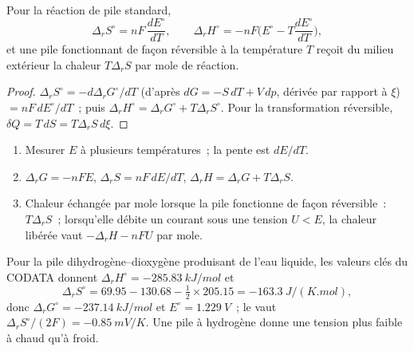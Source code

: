 \begin{proposition}\label{prop:b2:cell-thermodynamics:entropy}
Pour la réaction de pile standard,
\[
  \Delta_r S^\circ = nF\,\frac{dE^\circ}{dT}, \qquad
  \Delta_r H^\circ = -nF\Big(E^\circ - T\frac{dE^\circ}{dT}\Big),
\]
et une pile fonctionnant de façon réversible à la température $T$ reçoit du
milieu extérieur la chaleur $T\Delta_r S$ par mole de réaction.
\end{proposition}

\begin{proof}
$\Delta_r S^\circ = -d\Delta_r G^\circ/dT$ (d'après $dG = -S\,dT + V\,dp$, dérivée
par rapport à $\xi$) $= nF\,dE^\circ/dT$~; puis $\Delta_r H^\circ = \Delta_r G^\circ
+ T\Delta_r S^\circ$. Pour la transformation réversible, $\delta Q = T\,dS = T\Delta_r S\,
d\xi$.
\end{proof}

\begin{method}\label{met:b2:cell-thermodynamics:cell-data}
\begin{enumerate}
  \item Mesurer $E$ à plusieurs températures~; la pente est $dE/dT$.
  \item $\Delta_r G = -nFE$, $\Delta_r S = nF\,dE/dT$, $\Delta_r H = \Delta_r G +
        T\Delta_r S$.
  \item Chaleur échangée par mole lorsque la pile fonctionne de façon réversible~: $T\Delta_r S$~;
        lorsqu'elle débite un courant sous une tension $U < E$, la chaleur libérée vaut
        $-\Delta_r H - nFU$ par mole.
\end{enumerate}
\end{method}

Pour la pile dihydrogène--dioxygène produisant de l'eau liquide, les valeurs clés du CODATA
donnent $\Delta_r H^\circ = \qty{-285.83}{kJ/mol}$ et
\[
  \Delta_r S^\circ = 69.95 - 130.68 - \tfrac12 \times 205.15 = \qty{-163.3}{J/(K.mol)} ,
\]
donc $\Delta_r G^\circ = \qty{-237.14}{kJ/mol}$ et $E^\circ = \qty{1.229}{V}$~; le
 vaut $\Delta_r S^\circ/(2F) = \qty{-0.85}{mV/K}$. Une pile à hydrogène donne une tension
plus faible à chaud qu'à froid.

